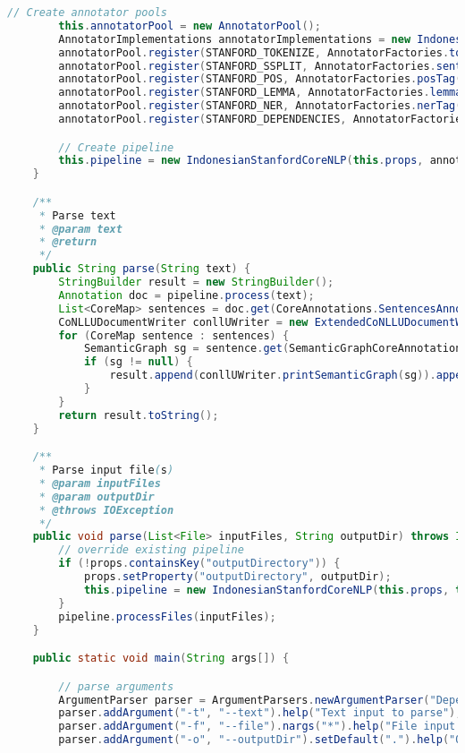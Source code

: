 \begin{lstlisting}[language=Java]
        // Create annotator pools
        this.annotatorPool = new AnnotatorPool();
        AnnotatorImplementations annotatorImplementations = new IndonesianAnnotatorImplementations();
        annotatorPool.register(STANFORD_TOKENIZE, AnnotatorFactories.tokenize(props, annotatorImplementations));
        annotatorPool.register(STANFORD_SSPLIT, AnnotatorFactories.sentenceSplit(props, annotatorImplementations));
        annotatorPool.register(STANFORD_POS, AnnotatorFactories.posTag(props, annotatorImplementations));
        annotatorPool.register(STANFORD_LEMMA, AnnotatorFactories.lemma(props, annotatorImplementations));
        annotatorPool.register(STANFORD_NER, AnnotatorFactories.nerTag(props, annotatorImplementations));
        annotatorPool.register(STANFORD_DEPENDENCIES, AnnotatorFactories.dependencies(props, annotatorImplementations));

        // Create pipeline
        this.pipeline = new IndonesianStanfordCoreNLP(this.props, annotatorPool);
    }

    /**
     * Parse text
     * @param text
     * @return
     */
    public String parse(String text) {
        StringBuilder result = new StringBuilder();
        Annotation doc = pipeline.process(text);
        List<CoreMap> sentences = doc.get(CoreAnnotations.SentencesAnnotation.class);
        CoNLLUDocumentWriter conllUWriter = new ExtendedCoNLLUDocumentWriter();
        for (CoreMap sentence : sentences) {
            SemanticGraph sg = sentence.get(SemanticGraphCoreAnnotations.BasicDependenciesAnnotation.class);
            if (sg != null) {
                result.append(conllUWriter.printSemanticGraph(sg)).append("\n");
            }
        }
        return result.toString();
    }

    /**
     * Parse input file(s)
     * @param inputFiles
     * @param outputDir
     * @throws IOException
     */
    public void parse(List<File> inputFiles, String outputDir) throws IOException, SQLException, ClassNotFoundException {
        // override existing pipeline
        if (!props.containsKey("outputDirectory")) {
            props.setProperty("outputDirectory", outputDir);
            this.pipeline = new IndonesianStanfordCoreNLP(this.props, this.annotatorPool);
        }
        pipeline.processFiles(inputFiles);
    }

    public static void main(String args[]) {

        // parse arguments
        ArgumentParser parser = ArgumentParsers.newArgumentParser("DependencyParser").defaultHelp(true).description("Generate CONLL-U dependency tree from Indonesian text");
        parser.addArgument("-t", "--text").help("Text input to parse");
        parser.addArgument("-f", "--file").nargs("*").help("File input to parse");
        parser.addArgument("-o", "--outputDir").setDefault(".").help("Output directory");


\end{lstlisting}
